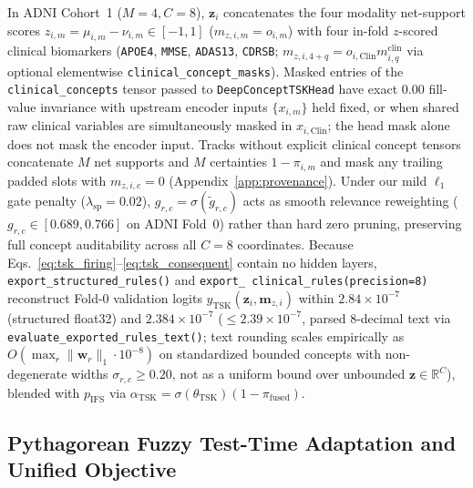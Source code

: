 \documentclass[10pt,twocolumn]{article}
\begin{document}
In ADNI Cohort~1 ($M=4, C=8$), $\bm{z}_i$ concatenates the four modality net-support scores
$z_{i,m} = \mu_{i,m} - \nu_{i,m} \in [-1, 1]$ ($m_{z,i,m}=o_{i,m}$) with four in-fold
$z$-scored clinical biomarkers (\texttt{APOE4}, \texttt{MMSE}, \texttt{ADAS13}, \texttt{CDRSB};
$m_{z,i,4+q}=o_{i,\text{Clin}} m^{\text{clin}}_{i,q}$ via optional elementwise
\texttt{clinical\_\allowbreak concept\_\allowbreak masks}). Masked entries of the
\texttt{clinical\_\allowbreak concepts} tensor passed to \texttt{DeepConceptTSKHead} have
exact $0.00$ fill-value invariance with upstream encoder inputs $\{x_{i,m}\}$ held fixed, or
when shared raw clinical variables are simultaneously masked in $x_{i,\text{Clin}}$; the head
mask alone does not mask the encoder input. Tracks without explicit clinical concept tensors
concatenate $M$ net supports and $M$ certainties $1-\pi_{i,m}$ and mask any trailing padded
slots with $m_{z,i,c}=0$ (Appendix~\ref{app:provenance}). Under our mild $\ell_1$ gate penalty
($\lambda_{\text{sp}}=0.02$), $g_{r,c} = \sigma(\tilde{g}_{r,c})$ acts as smooth relevance
reweighting ($g_{r,c} \in [0.689, 0.766]$ on ADNI Fold~0) rather than hard zero pruning,
preserving full concept auditability across all $C=8$ coordinates. Because
Eqs.~\eqref{eq:tsk_firing}--\eqref{eq:tsk_consequent} contain no hidden layers,
\texttt{export\_\allowbreak structured\_\allowbreak rules()} and \texttt{export\_\allowbreak
clinical\_\allowbreak rules\allowbreak(precision=8)} reconstruct Fold-0 validation logits
$y_{\text{TSK}}(\bm{z}_i, \bm{m}_{z,i})$ within $2.84 \times 10^{-7}$ (structured float32) and
$2.384 \times 10^{-7}$ ($\le 2.39 \times 10^{-7}$, parsed 8-decimal text via
\texttt{evaluate\_\allowbreak exported\_\allowbreak rules\_\allowbreak text()}; text rounding
scales empirically as $O(\max_r\|\bm{w}_r\|_1\cdot 10^{-8})$ on standardized bounded concepts
with non-degenerate widths $\sigma_{r,c}\ge 0.20$, not as a uniform bound over unbounded
$\bm{z}\in\mathbb{R}^C$), blended with
$p_{\text{IFS}}$ via $\alpha_{\text{TSK}} = \sigma(\theta_{\text{TSK}})(1 -
\pi_{\text{fused}})$.

\subsection{Pythagorean Fuzzy Test-Time Adaptation and Unified Objective}
\end{document}
